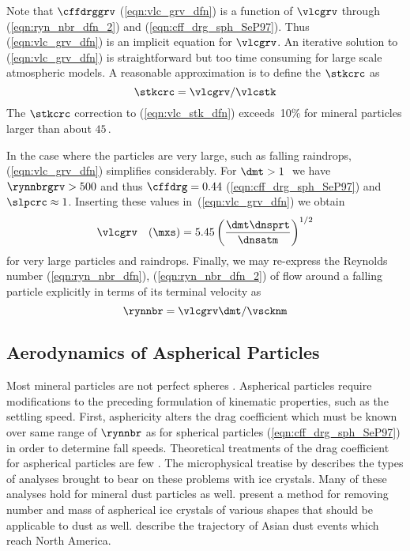 \documentclass[12pt,twoside]{book}
\begin{document}
Note that $\cffdrggrv$ (\ref{eqn:vlc_grv_dfn}) is a function of
$\vlcgrv$ through (\ref{eqn:ryn_nbr_dfn_2}) and
(\ref{eqn:cff_drg_sph_SeP97}).   
Thus (\ref{eqn:vlc_grv_dfn}) is an implicit equation for $\vlcgrv$.
An iterative solution to (\ref{eqn:vlc_grv_dfn}) is straightforward
but too time consuming for large scale atmospheric models.
A reasonable approximation is to define the  $\stkcrc$ as  
\begin{equation}
\stkcrc = \vlcgrv / \vlcstk
\label{eqn:stk_crc_dfn}
\end{equation}
The $\stkcrc$ correction to (\ref{eqn:vlc_stk_dfn}) exceeds~10\%
for mineral particles larger than about $45$\,\um.  

In the case where the particles are very large, such as falling
raindrops, (\ref{eqn:vlc_grv_dfn}) simplifies considerably. 
For $\dmt > 1$\,\mm\ we have $\rynnbrgrv > 500$ and thus 
$\cffdrg = 0.44$ 
(\ref{eqn:cff_drg_sph_SeP97}) and $\slpcrc \approx 1$.
Inserting these values in~(\ref{eqn:vlc_grv_dfn}) we obtain
\begin{equation}
\vlcgrv \quad\mbox{(\mxs)} = 5.45 \left( \frac{\dmt \dnsprt}{\dnsatm } \right)^{1/2}
\label{eqn:vlc_grv_pcp_dfn}
\end{equation}
for very large particles and raindrops.
Finally, we may re-express the Reynolds number
(\ref{eqn:ryn_nbr_dfn}), (\ref{eqn:ryn_nbr_dfn_2})
of flow around a falling particle explicitly in terms of its terminal
velocity as
\begin{equation}
\rynnbr = \vlcgrv \dmt / \vscknm 
\label{eqn:ryn_nbr_dfn_3}
\end{equation}

\subsection[Aerodynamics of Aspherical Particles]{Aerodynamics of Aspherical Particles}\label{sxn:aer_asp}
Most mineral particles are not perfect spheres \cite[]{Gin03}.
Aspherical particles require modifications to the preceding
formulation of kinematic properties, such as the settling speed.
First, asphericity alters the drag coefficient which must be known
over same range of $\rynnbr$ as for spherical particles
(\ref{eqn:cff_drg_sph_SeP97}) in order to determine fall speeds.
Theoretical treatments of the drag coefficient for aspherical
particles are few \cite[][]{Abr70,Boo71,Mit96,Gin03}.
The microphysical treatise by \cite{Wan02} describes the types of
analyses brought to bear on these problems with ice crystals.
Many of these analyses hold for mineral dust particles as well.
\cite{IMA01} present a method for removing number and mass of
aspherical ice crystals of various shapes that should be applicable to  
dust as well. 
\cite{VaC02} describe the trajectory of Asian dust events which reach 
North America.
\end{document}
